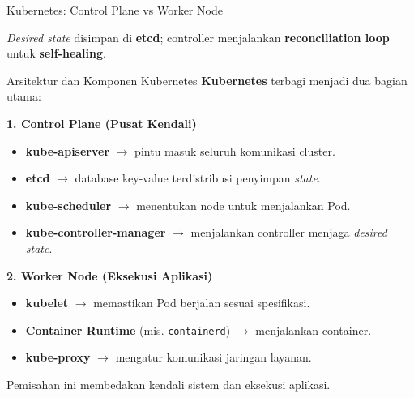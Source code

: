 \documentclass[aspectratio=169, table]{beamer}
\begin{document}
\begin{frame}{Kubernetes: Control Plane vs Worker Node}
{
}

\vspace{2pt}
{\small\textit{Desired state} disimpan di \textbf{etcd}; controller menjalankan \textbf{reconciliation loop} untuk \textbf{self-healing}.}
\end{frame}

\begin{frame}{Arsitektur dan Komponen Kubernetes}
\vspace{10pt}
\textbf{Kubernetes} terbagi menjadi dua bagian utama:

\vspace{6pt}
\textbf{1. Control Plane (Pusat Kendali)}
\begin{itemize}
    \item \textbf{kube-apiserver} $\rightarrow$ pintu masuk seluruh komunikasi cluster.
    \item \textbf{etcd} $\rightarrow$ database key-value terdistribusi penyimpan \textit{state}.
    \item \textbf{kube-scheduler} $\rightarrow$ menentukan node untuk menjalankan Pod.
    \item \textbf{kube-controller-manager} $\rightarrow$ menjalankan controller menjaga \textit{desired state}.
\end{itemize}

\vspace{6pt}
\textbf{2. Worker Node (Eksekusi Aplikasi)}
\begin{itemize}
    \item \textbf{kubelet} $\rightarrow$ memastikan Pod berjalan sesuai spesifikasi.
    \item \textbf{Container Runtime} (mis. \texttt{containerd}) $\rightarrow$ menjalankan container.
    \item \textbf{kube-proxy} $\rightarrow$ mengatur komunikasi jaringan layanan.
\end{itemize}

\vspace{4pt}
\small
Pemisahan ini membedakan kendali sistem dan eksekusi aplikasi.
\end{frame}
\end{document}
